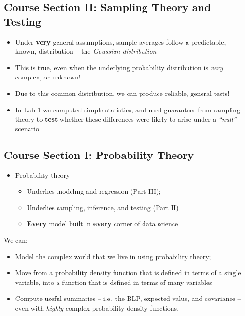 \documentclass[
]{book}
\providecommand{\tightlist}{%
  \setlength{\itemsep}{0pt}\setlength{\parskip}{0pt}}
\theoremstyle{definition}
\theoremstyle{definition}
\theoremstyle{definition}
\theoremstyle{definition}
\theoremstyle{remark}
\begin{document}
\hypertarget{course-section-ii-sampling-theory-and-testing}{%
\subsection{Course Section II: Sampling Theory and Testing}\label{course-section-ii-sampling-theory-and-testing}}

\begin{itemize}
\tightlist
\item
  Under \textbf{very} general assumptions, sample averages follow a predictable, known, distribution -- the \emph{Gaussian distribution}
\item
  This is true, even when the underlying probability distribution is \emph{very} complex, or unknown!
\item
  Due to this common distribution, we can produce reliable, general tests!
\item
  In Lab 1 we computed simple statistics, and used guarantees from sampling theory to \textbf{test} whether these differences were likely to arise under a \emph{``null''} scenario
\end{itemize}

\hypertarget{course-section-i-probability-theory}{%
\subsection{Course Section I: Probability Theory}\label{course-section-i-probability-theory}}

\begin{itemize}
\tightlist
\item
  Probability theory

  \begin{itemize}
  \tightlist
  \item
    Underlies modeling and regression (Part III);
  \item
    Underlies sampling, inference, and testing (Part II)
  \item
    \textbf{Every} model built in \textbf{every} corner of data science
  \end{itemize}
\end{itemize}

We can:

\begin{itemize}
\tightlist
\item
  Model the complex world that we live in using probability theory;
\item
  Move from a probability density function that is defined in terms of a single variable, into a function that is defined in terms of many variables
\item
  Compute useful summaries -- i.e.~the BLP, expected value, and covariance -- even with \emph{highly} complex probability density functions.
\end{itemize}
\end{document}
